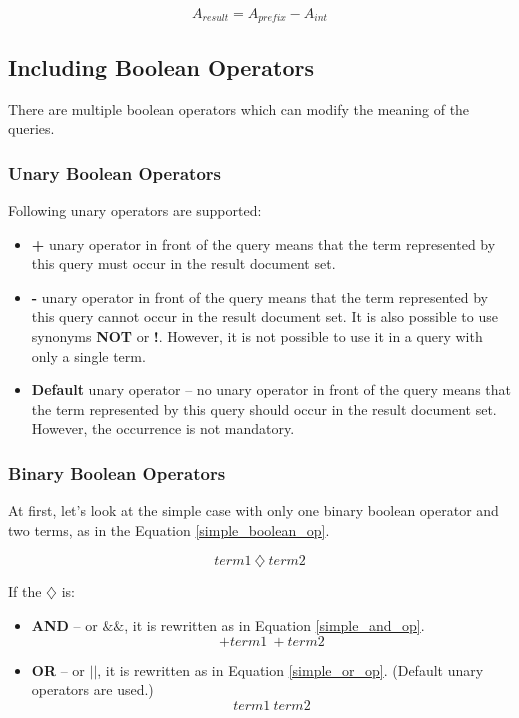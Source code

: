 \begin{equation}
\label{ut_automaton}
A_{result} = A_{prefix} - A_{int}
\end{equation}

\subsection{Including Boolean Operators}
\label{boolean_ops}

There are multiple boolean operators which can modify the meaning of the queries.

\subsubsection{Unary Boolean Operators}
Following unary operators are supported:
\begin{itemize}
    \item \textbf{+} unary operator in front of the query means that the term represented by this query must occur in
    the result document set.
    \item \textbf{-} unary operator in front of the query means that the term represented by this query cannot occur in the result document set.
    It is also possible to use synonyms \textbf{NOT} or \textbf{!}. However, it is not possible to use it in a query
    with only a single term.
    \item \textbf{Default} unary operator – no unary operator in front of the query means that the term represented by this query should occur
    in the result document set. However, the occurrence is not mandatory.
\end{itemize}

\subsubsection{Binary Boolean Operators}

At first, let's look at the simple case with only one binary boolean operator and two terms, as in the Equation \ref{simple_boolean_op}.

\begin{equation}
\label{simple_boolean_op}
term1\ \diamondsuit \ term2
\end{equation}

If the $\diamondsuit$ is:
\begin{itemize}
    \item \textbf{AND} – or $\&\&$, it is rewritten as in Equation \ref{simple_and_op}.
    \begin{equation}
    \label{simple_and_op}
    +term1\ +term2
    \end{equation}
    \item \textbf{OR} – or $\vert\vert$, it is rewritten as in Equation \ref{simple_or_op}. (Default unary operators are used.)
    \begin{equation}
    \label{simple_or_op}
    term1\ term2
    \end{equation}
\end{itemize}


